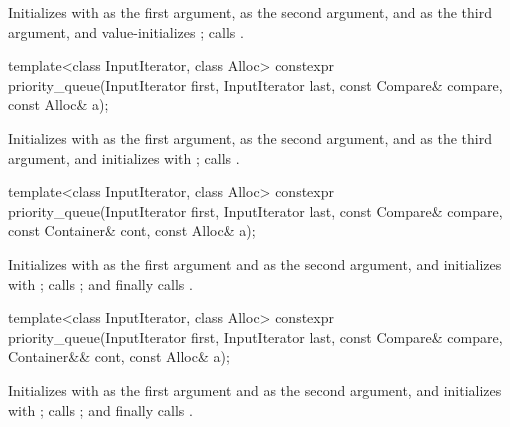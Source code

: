 \begin{itemdescr}
\pnum
\effects
Initializes  with
 as the first argument,
 as the second argument, and
 as the third argument, and
value-initializes ;
calls .
\end{itemdescr}

%
\begin{itemdecl}
template<class InputIterator, class Alloc>
  constexpr priority_queue(InputIterator first, InputIterator last,
                           const Compare& compare, const Alloc& a);
\end{itemdecl}

\begin{itemdescr}
\pnum
\effects
Initializes  with
 as the first argument,
 as the second argument, and
 as the third argument, and
initializes  with ;
calls .
\end{itemdescr}

%
\begin{itemdecl}
template<class InputIterator, class Alloc>
  constexpr priority_queue(InputIterator first, InputIterator last, const Compare& compare,
                           const Container& cont, const Alloc& a);
\end{itemdecl}

\begin{itemdescr}
\pnum
\effects
Initializes  with
 as the first argument and  as the second argument, and
initializes  with ;
calls ; and
finally calls .
\end{itemdescr}

%
\begin{itemdecl}
template<class InputIterator, class Alloc>
  constexpr priority_queue(InputIterator first, InputIterator last, const Compare& compare,
                           Container&& cont, const Alloc& a);
\end{itemdecl}

\begin{itemdescr}
\pnum
\effects
Initializes  with
 as the first argument and
 as the second argument, and
initializes  with ;
calls ; and
finally calls .
\end{itemdescr}

